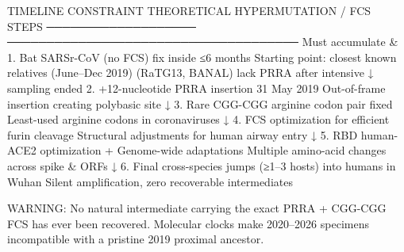TIMELINE CONSTRAINT                  THEORETICAL HYPERMUTATION / FCS STEPS
───────────────────                  ─────────────────────────────────────
Must accumulate &                    1. Bat SARSr-CoV (no FCS)
fix inside ≤6 months                   Starting point: closest known relatives
(June–Dec 2019)                         (RaTG13, BANAL) lack PRRA
after intensive                             ↓
sampling ended                       2. +12-nucleotide PRRA insertion
31 May 2019                             Out-of-frame insertion creating polybasic site
                                        ↓
                                     3. Rare CGG-CGG arginine codon pair fixed
                                        Least-used arginine codons in coronaviruses
                                        ↓
                                     4. FCS optimization for efficient furin cleavage
                                        Structural adjustments for human airway entry
                                        ↓
                                     5. RBD human-ACE2 optimization
                                        + Genome-wide adaptations
                                        Multiple amino-acid changes across spike & ORFs
                                        ↓
                                     6. Final cross-species jumps (≥1–3 hosts)
                                        into humans in Wuhan
                                        Silent amplification, zero recoverable intermediates

WARNING: No natural intermediate carrying the exact PRRA + CGG-CGG FCS has ever been recovered.
Molecular clocks make 2020–2026 specimens incompatible with a pristine 2019 proximal ancestor.
